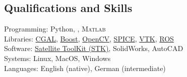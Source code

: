 \subsection*{Qualifications and Skills}
{}

Programming: Python, \CC, \textsc{Matlab} \\
Libraries: \href{https://www.cgal.org/}{CGAL}, \href{https://www.boost.org/}{Boost}, \href{https:://opencv.org/}{OpenCV}, \href{https://naif.jpl.nasa.gov/naif/toolkit.html}{SPICE}, \href{https://www.vtk.org}{VTK}, \href{http://www.ros.org}{ROS} \\
Software: \href{http://www.agi.com/products/engineering-tools}{Satellite ToolKit (STK)}, SolidWorks, AutoCAD \\
Systems: Linux, MacOS, Windows \\
Languages: English (native), German (intermediate)
